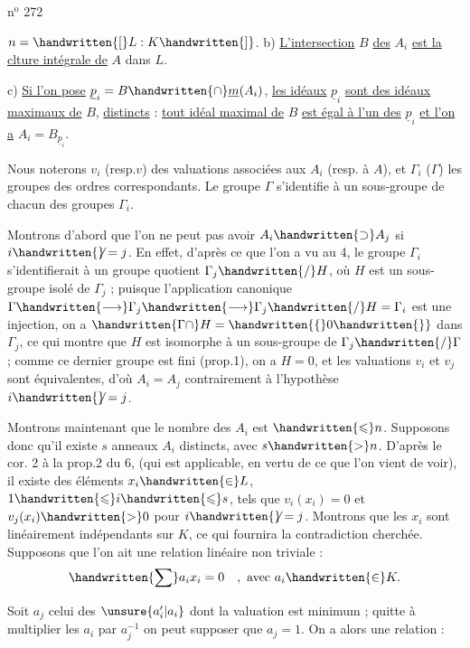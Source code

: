\hfill n$^{\mathrm{o}}$ 272

$n=\handwritten{[}L:K\handwritten{]}$. \quad b) \uline{L'intersection} $B$ \uline{des} $A_i$ \uline{est la clture intégrale de} $A$ dans $L$.

c) \uline{Si l'on pose} $\underline{p}_i=B\handwritten{\cap}\underline{m}(A_i)$, \uline{les idéaux} $\underline{p}_i$ \uline{sont des idéaux maximaux de} $B$, \uline{distincts} : \uline{tout idéal maximal de} $B$ \uline{est égal à l'un des} $\underline{p}_i$ \uline{et l'on a}  $A_i=B_{\underline{p}_i}$.

Nous noterons $v_i$ (resp.$v$) des valuations associées aux $A_i$ (resp. à $A$), et $\Gamma_i$ ($\Gamma$) les groupes des ordres correspondants. Le groupe $\Gamma$ s'identifie à un sous-groupe de chacun des groupes $\Gamma_i$.

Montrons d'abord que l'on ne peut pas avoir $A_i\handwritten{\supset}A_j$ si $i\handwritten{\not}=j$. En effet, d'après ce que l'on a vu au \handwritten{\S}4, le groupe $\Gamma_i$ s'identifierait à un groupe quotient $\Gamma_j\handwritten{/}H$, où $H$ est un sous-groupe isolé de $\Gamma_j$ ; puisque l'application canonique $\Gamma\handwritten{\longrightarrow}\Gamma_j\handwritten{\longrightarrow}\Gamma_j\handwritten{/}H=\Gamma_i$ est une injection, on a $\handwritten{\Gamma\cap}H=\handwritten{\{}0\handwritten{\}}$ dans $\Gamma_j$, ce qui montre que $H$ est isomorphe à un sous-groupe de $\Gamma_j\handwritten{/}\Gamma$ ; comme ce dernier groupe est fini (prop.1), on a $H=0$, et les valuations $v_i$ et $v_j$ sont équivalentes, d'où $A_i=A_j$ contrairement à l'hypothèse $i\handwritten{\not}=j$.

Montrons maintenant que le nombre des $A_i$ est  $\handwritten{\leqslant}n$. Supposons donc qu'il existe $s$ anneaux $A_i$ distincts, avec $s\handwritten{>}n$. D'après le cor. 2 à la prop.2 du \handwritten{\S}6, (qui est applicable, en vertu de ce que l'on vient de voir), il existe des éléments $x_i\handwritten{\in}L$, $1\handwritten{\leqslant}i\handwritten{\leqslant}s$, tels que $v_i(x_i)=0$ et $v_j(x_i)\handwritten{>}0$ pour $i\handwritten{\not}=j$. Montrons que les $x_i$ sont linéairement indépendants sur $K$, ce qui fournira la contradiction cherchée. Supposons que l'on ait une relation linéaire non triviale :
\[
\handwritten{\sum} a_i x_i=0\quad,\ \text{avec }a_i\handwritten{\in}K.
\]

Soit $a_j$ celui des $\unsure{a'_i|a_i}$ dont la valuation est minimum ; quitte à multiplier les $a_i$ par $a_j^{-1}$ on peut supposer que $a_j=1$. On a alors une relation :

